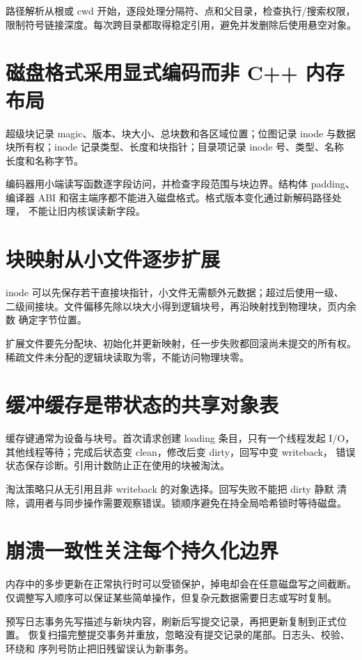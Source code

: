 路径解析从根或 cwd 开始，逐段处理分隔符、点和父目录，检查执行/搜索权限，
限制符号链接深度。每次跨目录都取得稳定引用，避免并发删除后使用悬空对象。

\section{磁盘格式采用显式编码而非 C++ 内存布局}

超级块记录 magic、版本、块大小、总块数和各区域位置；位图记录 inode 与数据
块所有权；inode 记录类型、长度和块指针；目录项记录 inode 号、类型、名称
长度和名称字节。

编码器用小端读写函数逐字段访问，并检查字段范围与块边界。结构体 padding、
编译器 ABI 和宿主端序都不能进入磁盘格式。格式版本变化通过新解码路径处理，
不能让旧内核误读新字段。

\section{块映射从小文件逐步扩展}

inode 可以先保存若干直接块指针，小文件无需额外元数据；超过后使用一级、
二级间接块。文件偏移先除以块大小得到逻辑块号，再沿映射找到物理块，页内余数
确定字节位置。

扩展文件要先分配块、初始化并更新映射，任一步失败都回滚尚未提交的所有权。
稀疏文件未分配的逻辑块读取为零，不能访问物理块零。

\section{缓冲缓存是带状态的共享对象表}

缓存键通常为设备与块号。首次请求创建 loading 条目，只有一个线程发起 I/O，
其他线程等待；完成后状态变 clean，修改后变 dirty，回写中变 writeback，
错误状态保存诊断。引用计数防止正在使用的块被淘汰。

淘汰策略只从无引用且非 writeback 的对象选择。回写失败不能把 dirty 静默
清除，调用者与同步操作需要观察错误。锁顺序避免在持全局哈希锁时等待磁盘。

\section{崩溃一致性关注每个持久化边界}

内存中的多步更新在正常执行时可以受锁保护，掉电却会在任意磁盘写之间截断。
仅调整写入顺序可以保证某些简单操作，但复杂元数据需要日志或写时复制。

预写日志事务先写描述与新块内容，刷新后写提交记录，再把更新复制到正式位置。
恢复扫描完整提交事务并重放，忽略没有提交记录的尾部。日志头、校验、环绕和
序列号防止把旧残留误认为新事务。

